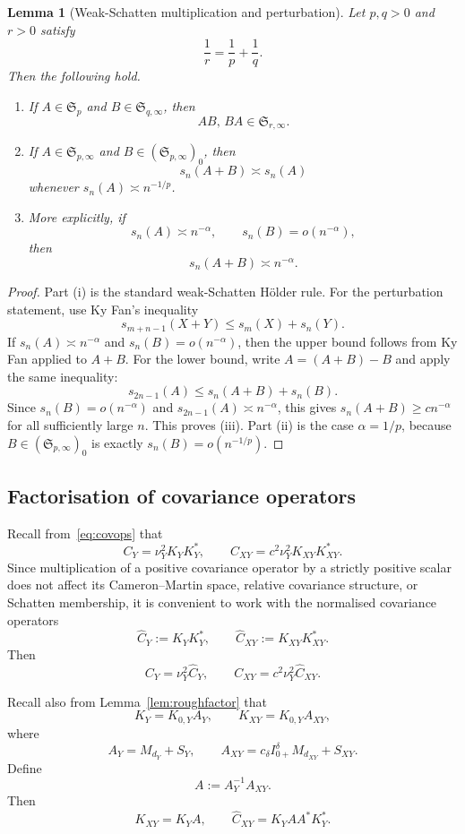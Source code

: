 \documentclass[11pt,a4paper]{amsart}
\theoremstyle{plain}
\newtheorem{lemma}[theorem]{Lemma}
\theoremstyle{definition}
\theoremstyle{remark}
\begin{document}
\begin{lemma}[Weak-Schatten multiplication and perturbation]\label{lem:weakschatten}
Let $p,q>0$ and $r>0$ satisfy
\[
\frac1r=\frac1p+\frac1q.
\]
Then the following hold.
\begin{enumerate}[label=(\roman*)]
\item If $A\in \mathfrak S_p$ and $B\in \mathfrak S_{q,\infty}$, then
\[
AB,\,BA\in \mathfrak S_{r,\infty}.
\]
\item If $A\in \mathfrak S_{p,\infty}$ and $B\in (\mathfrak S_{p,\infty})_0$, then
\[
s_n(A+B)\asymp s_n(A)
\]
whenever $s_n(A)\asymp n^{-1/p}$.
\item More explicitly, if
\[
s_n(A)\asymp n^{-\alpha},
\qquad
s_n(B)=o(n^{-\alpha}),
\]
then
\[
s_n(A+B)\asymp n^{-\alpha}.
\]
\end{enumerate}
\end{lemma}

\begin{proof}
Part (i) is the standard weak-Schatten H\"older rule. For the perturbation statement, use Ky Fan's inequality
\[
s_{m+n-1}(X+Y)\le s_m(X)+s_n(Y).
\]
If $s_n(A)\asymp n^{-\alpha}$ and $s_n(B)=o(n^{-\alpha})$, then the upper bound follows from Ky
Fan applied to $A+B$. For the lower bound, write $A=(A+B)-B$ and apply the same inequality:
\[
s_{2n-1}(A)\le s_n(A+B)+s_n(B).
\]
Since $s_n(B)=o(n^{-\alpha})$ and $s_{2n-1}(A)\asymp n^{-\alpha}$, this gives
$s_n(A+B)\ge c n^{-\alpha}$ for all sufficiently large $n$. This proves (iii). Part (ii) is the
case $\alpha=1/p$, because $B\in(\mathfrak S_{p,\infty})_0$ is exactly
$s_n(B)=o(n^{-1/p})$.
\end{proof}

\subsection{Factorisation of covariance operators}

Recall from~\eqref{eq:covops} that
\[
C_Y=\nu_Y^2 K_YK_Y^*,
\qquad
C_{XY}=c^2\nu_Y^2 K_{XY}K_{XY}^*.
\]
Since multiplication of a positive covariance operator by a strictly positive scalar does not affect its Cameron--Martin space, relative covariance structure, or Schatten membership, it is convenient to work with the normalised covariance operators
\[
\widehat C_Y := K_YK_Y^*,
\qquad
\widehat C_{XY} := K_{XY}K_{XY}^*.
\]
Then
\[
C_Y=\nu_Y^2\widehat C_Y,
\qquad
C_{XY}=c^2\nu_Y^2\widehat C_{XY}.
\]

Recall also from Lemma~\ref{lem:roughfactor} that
\[
K_Y = K_{0,Y}A_Y,
\qquad
K_{XY}=K_{0,Y}A_{XY},
\]
where
\[
A_Y=M_{d_Y}+S_Y,
\qquad
A_{XY}=c_\delta I_{0+}^\delta M_{d_{XY}}+S_{XY}.
\]
Define
\[
A:=A_Y^{-1}A_{XY}.
\]
Then
\[
K_{XY}=K_YA,
\qquad
\widehat C_{XY}=K_YAA^*K_Y^*.
\]
\end{document}

